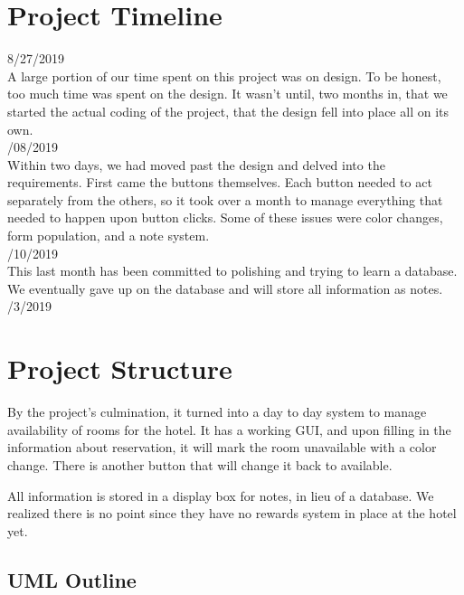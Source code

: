 \documentclass[10pt,conference,onecolumn,compsoc]{IEEEtran}
\begin{document}
\section{Project Timeline}
8/27/2019\\

A large portion of our time spent on this project was on design. To be honest, too much time was spent on the design. It wasn't until, two months in, that we started the actual coding of the project, that the design fell into place all on its own. \\
/08/2019 \\

Within two days, we had moved past the design and delved into the requirements. First came the buttons themselves. Each button needed to act separately from the others, so it took over a month to manage everything that needed to happen upon button clicks. Some of these issues were color changes, form population, and a note system. \\
/10/2019 \\

This last month has been committed to polishing and trying to learn a database. We eventually gave up on the database and will store all information as notes. \\
/3/2019

\section{Project Structure}
By the project's culmination, it turned into a day to day system to manage availability of rooms for the hotel. It has a working GUI, and upon filling in the information about reservation, it will mark the room unavailable with a color change. There is another button that will change it back to available. 

All information is stored in a display box for notes, in lieu of a database. We realized there is no point since they have no rewards system in place at the hotel yet. 

\subsection{UML Outline}
\end{document}
